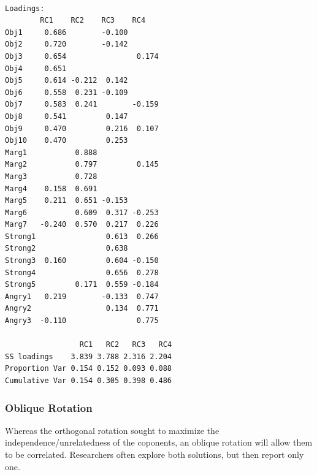 \documentclass[
  english,
]{book}
\newenvironment{Shaded}{\begin{snugshade}}{\end{snugshade}}
\newcommand{\DataTypeTok}[1]{\textcolor[rgb]{0.13,0.29,0.53}{#1}}
\newcommand{\DecValTok}[1]{\textcolor[rgb]{0.00,0.00,0.81}{#1}}
\newcommand{\KeywordTok}[1]{\textcolor[rgb]{0.13,0.29,0.53}{\textbf{#1}}}
\newcommand{\NormalTok}[1]{#1}
\newcommand{\OperatorTok}[1]{\textcolor[rgb]{0.81,0.36,0.00}{\textbf{#1}}}
\newcommand{\OtherTok}[1]{\textcolor[rgb]{0.56,0.35,0.01}{#1}}
\newcommand{\StringTok}[1]{\textcolor[rgb]{0.31,0.60,0.02}{#1}}
\begin{document}
\begin{Shaded}
\end{Shaded}

\begin{verbatim}

Loadings:
        RC1    RC2    RC3    RC4   
Obj1     0.686        -0.100       
Obj2     0.720        -0.142       
Obj3     0.654                0.174
Obj4     0.651                     
Obj5     0.614 -0.212  0.142       
Obj6     0.558  0.231 -0.109       
Obj7     0.583  0.241        -0.159
Obj8     0.541         0.147       
Obj9     0.470         0.216  0.107
Obj10    0.470         0.253       
Marg1           0.888              
Marg2           0.797         0.145
Marg3           0.728              
Marg4    0.158  0.691              
Marg5    0.211  0.651 -0.153       
Marg6           0.609  0.317 -0.253
Marg7   -0.240  0.570  0.217  0.226
Strong1                0.613  0.266
Strong2                0.638       
Strong3  0.160         0.604 -0.150
Strong4                0.656  0.278
Strong5         0.171  0.559 -0.184
Angry1   0.219        -0.133  0.747
Angry2                 0.134  0.771
Angry3  -0.110                0.775

                 RC1   RC2   RC3   RC4
SS loadings    3.839 3.788 2.316 2.204
Proportion Var 0.154 0.152 0.093 0.088
Cumulative Var 0.154 0.305 0.398 0.486
\end{verbatim}

\hypertarget{oblique-rotation}{%
\subsubsection{Oblique Rotation}\label{oblique-rotation}}

Whereas the orthogonal rotation sought to maximize the independence/unrelatedness of the coponents, an oblique rotation will allow them to be correlated. Researchers often explore both solutions, but then report only one.
\end{document}
